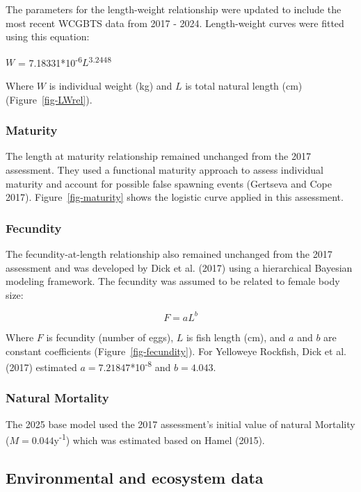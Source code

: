 \documentclass[
]{scrartcl}
\begin{document}
The parameters for the length-weight relationship were updated to
include the most recent WCGBTS data from 2017 - 2024. Length-weight
curves were fitted using this equation:

\(W\) = 7.18331*10\textsuperscript{-6}\(L\)\textsuperscript{3.2448}

Where \(W\) is individual weight (kg) and \(L\) is total natural length
(cm) (Figure~\ref{fig-LWrel}).

\subsubsection{Maturity}\label{maturity}

The length at maturity relationship remained unchanged from the 2017
assessment. They used a functional maturity approach to assess
individual maturity and account for possible false spawning events
(Gertseva and Cope 2017). Figure~\ref{fig-maturity} shows the logistic
curve applied in this assessment.

\subsubsection{Fecundity}\label{fecundity}

The fecundity-at-length relationship also remained unchanged from the
2017 assessment and was developed by Dick et al. (2017) using a
hierarchical Bayesian modeling framework. The fecundity was assumed to
be related to female body size:

\[
F = aL^b
\]

Where \(F\) is fecundity (number of eggs), \(L\) is fish length (cm),
and \(a\) and \(b\) are constant coefficients
(Figure~\ref{fig-fecundity}). For Yelloweye Rockfish, Dick et al. (2017)
estimated \(a = 7.21847\)*10\textsuperscript{-8} and \(b = 4.043\).

\subsubsection{Natural Mortality}\label{natural-mortality}

The 2025 base model used the 2017 assessment's initial value of natural
Mortality (\(M = 0.044\)y\textsuperscript{-1}) which was estimated based
on Hamel (2015).

\subsection{Environmental and ecosystem
data}\label{environmental-and-ecosystem-data}
\end{document}
